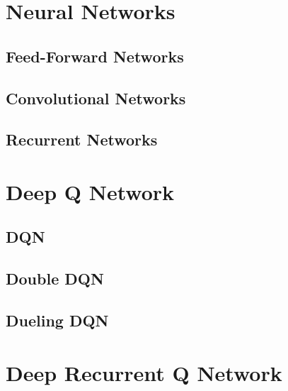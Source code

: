 \documentclass[12pt]{book}
\newcommand{\<}{\langle}
\renewcommand{\>}{\rangle}
\begin{document}
\chapter{Neural Networks}

\section{Feed-Forward Networks}

\section{Convolutional Networks}

\section{Recurrent Networks}


\chapter{Deep Q Network}

\section{DQN}

\section{Double DQN}

\section{Dueling DQN}


\chapter{Deep Recurrent Q Network}



\begin{thebibliography}{10}
\end{thebibliography}
\end{document}
